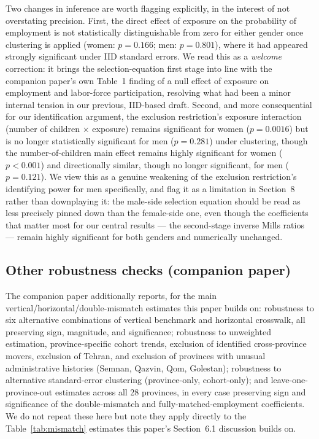 \documentclass[11pt]{article}
\begin{document}
Two changes in inference are worth flagging explicitly, in the interest of not overstating precision. First, the direct effect of exposure on the probability of employment is not statistically distinguishable from zero for either gender once clustering is applied (women: $p=0.166$; men: $p=0.801$), where it had appeared strongly significant under IID standard errors. We read this as a \emph{welcome} correction: it brings the selection-equation first stage into line with the companion paper's own Table~1 finding of a null effect of exposure on employment and labor-force participation, resolving what had been a minor internal tension in our previous, IID-based draft. Second, and more consequential for our identification argument, the exclusion restriction's exposure interaction (number of children $\times$ exposure) remains significant for women ($p=0.0016$) but is no longer statistically significant for men ($p=0.281$) under clustering, though the number-of-children main effect remains highly significant for women ($p<0.001$) and directionally similar, though no longer significant, for men ($p=0.121$). We view this as a genuine weakening of the exclusion restriction's identifying power for men specifically, and flag it as a limitation in Section~8 rather than downplaying it: the male-side selection equation should be read as less precisely pinned down than the female-side one, even though the coefficients that matter most for our central results --- the second-stage inverse Mills ratios --- remain highly significant for both genders and numerically unchanged.

\subsection{Other robustness checks (companion paper)}

The companion paper additionally reports, for the main vertical/horizontal/double-mismatch estimates this paper builds on: robustness to six alternative combinations of vertical benchmark and horizontal crosswalk, all preserving sign, magnitude, and significance; robustness to unweighted estimation, province-specific cohort trends, exclusion of identified cross-province movers, exclusion of Tehran, and exclusion of provinces with unusual administrative histories (Semnan, Qazvin, Qom, Golestan); robustness to alternative standard-error clustering (province-only, cohort-only); and leave-one-province-out estimates across all 28 provinces, in every case preserving sign and significance of the double-mismatch and fully-matched-employment coefficients. We do not repeat these here but note they apply directly to the Table~\ref{tab:mismatch} estimates this paper's Section~6.1 discussion builds on.
\end{document}
